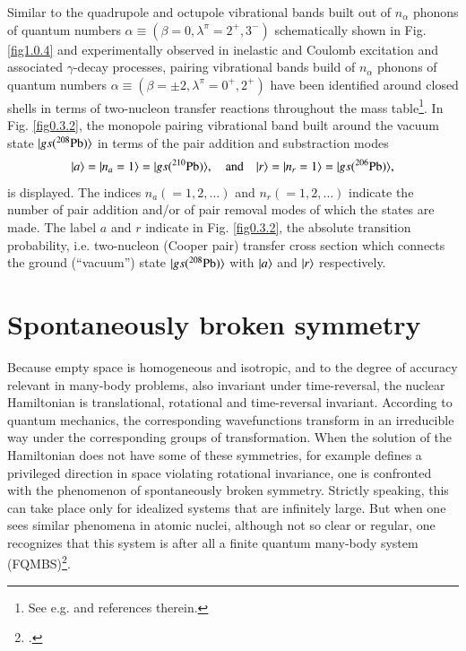 Similar to the quadrupole and octupole vibrational bands built out of $n_\alpha$ phonons of quantum numbers $\alpha\equiv(\beta=0,\lambda^\pi=2^+,3^-)$ schematically shown in Fig. \ref{fig1.0.4} and experimentally observed in inelastic and Coulomb excitation and associated $\gamma$-decay processes, pairing vibrational bands build of $n_\alpha$ phonons of quantum numbers $\alpha\equiv(\beta=\pm2,\lambda^\pi=0^+,2^+)$ have been identified around closed shells in terms of two-nucleon transfer reactions throughout the mass table\footnote{See e.g. \cite{Flynn:72} and references therein.}. In Fig. \ref{fig0.3.2}, the monopole pairing vibrational band built around the vacuum state $|{gs(^{208}\text{Pb})} \rangle$ in terms of the pair addition and substraction modes
\begin{align}\label{eq1.3.9}
|{a} \rangle=|{n_a=1} \rangle=|{gs(^{210}\text{Pb})} \rangle,\quad\text{and}\quad |{r} \rangle=|{n_r=1} \rangle=|{gs(^{206}\text{Pb})} \rangle,
\end{align}
is displayed. The indices $n_a(=1,2,\dots)$ and $n_r(=1,2,\dots)$ indicate the number of pair addition and/or of pair removal modes of which the states are made. The label $a$ and $r$ indicate in Fig. \ref{fig0.3.2}, the absolute transition probability, i.e. two-nucleon (Cooper pair) transfer cross section which connects the ground (``vacuum'') state $|{gs(^{208}\text{Pb})} \rangle$ with $|{a} \rangle$ and $|{r} \rangle$ respectively. 
\section{Spontaneously broken symmetry}\label{S1.4}
Because empty space is homogeneous and isotropic, and to the degree of accuracy relevant in many-body problems, also invariant under time-reversal, the nuclear Hamiltonian is translational, rotational and time-reversal invariant. According to quantum mechanics, the corresponding wavefunctions transform in an irreducible way under the corresponding groups of transformation.
When the solution  of the Hamiltonian does not have some of these symmetries, for example defines a privileged direction in space violating rotational invariance, one is confronted with the phenomenon of spontaneously broken symmetry. Strictly speaking, this can take place only for idealized systems that are infinitely large. But when one sees similar phenomena in atomic nuclei, although not so clear or regular, one recognizes that this system is after all a finite quantum many-body system (FQMBS)\footnote{\cite{Anderson:72,Anderson:84b}.}.
